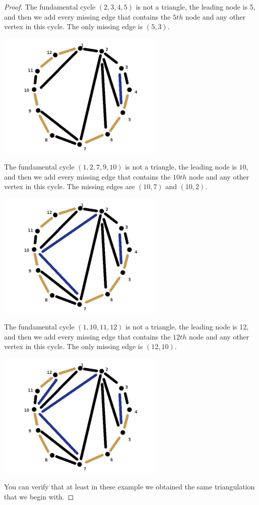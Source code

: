 \begin{proof}
    The fundamental cycle $(2, 3, 4, 5)$ is not a triangle, the leading node is 5, and then we
    add every missing edge that contains the $5th$ node and any other vertex in this cycle. 
    The only missing edge is $(5, 3)$.
    \begin{center}
        \includegraphics[width=8cm]{Homework1/Problem4/PlanarRootedTreeToTriangulation5.png}
    \end{center}
    
    
    The fundamental cycle $(1, 2, 7, 9, 10)$ is not a triangle, the leading node is $10$, and then
    we add every missing edge that contains the $10th$ node and any other vertex in this cycle.
    The missing edges are $(10, 7)$ and $(10, 2)$.
    \begin{center}
        \includegraphics[width=8cm]{Homework1/Problem4/PlanarRootedTreeToTriangulation6.png}
    \end{center}
    
    The fundamental cycle $(1, 10, 11, 12)$ is not a triangle, the leading node is 12, and then we
    add every missing edge that contains the $12th$ node and any other vertex in this cycle. 
    The only missing edge is $(12, 10)$.
    \begin{center}
        \includegraphics[width=8cm]{Homework1/Problem4/PlanarRootedTreeToTriangulation7.png}
    \end{center}
    
    You can verify that at least in these example we obtained the same triangulation that we begin with.
\end{proof}